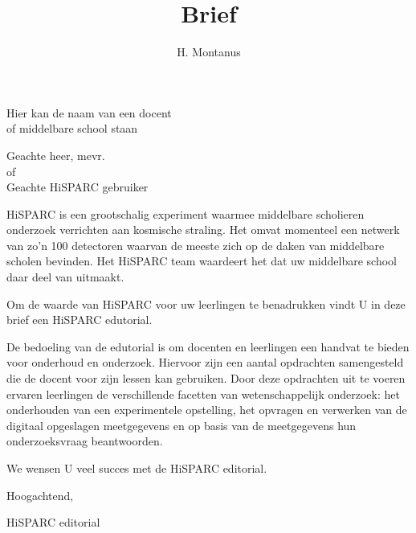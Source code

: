 




\title{Brief}
\author{H. Montanus}
\date{}

\maketitle
 
Hier kan de naam van een docent \\ of middelbare school staan

Geachte heer, mevr.  \\of   \\Geachte HiSPARC gebruiker

HiSPARC is een grootschalig experiment waarmee middelbare scholieren
onderzoek verrichten aan kosmische straling. Het omvat momenteel een
netwerk van zo'n 100 detectoren waarvan de meeste zich op de daken van
middelbare scholen bevinden. Het HiSPARC team waardeert het dat uw
middelbare school daar deel van uitmaakt.  

Om de waarde van HiSPARC voor uw leerlingen te benadrukken vindt U in
deze brief een HiSPARC edutorial.

De bedoeling van de edutorial is om docenten en leerlingen een handvat
te bieden voor onderhoud en onderzoek. Hiervoor zijn een aantal
opdrachten samengesteld die de docent voor zijn lessen kan gebruiken.
Door deze opdrachten uit te voeren ervaren leerlingen de verschillende
facetten van wetenschappelijk onderzoek: het onderhouden van een
experimentele opstelling, het opvragen en verwerken van de digitaal
opgeslagen meetgegevens en op basis van de meetgegevens hun
onderzoeksvraag beantwoorden. 

We wensen U veel succes met de HiSPARC editorial.
 
Hoogachtend,

HiSPARC editorial
 
 

